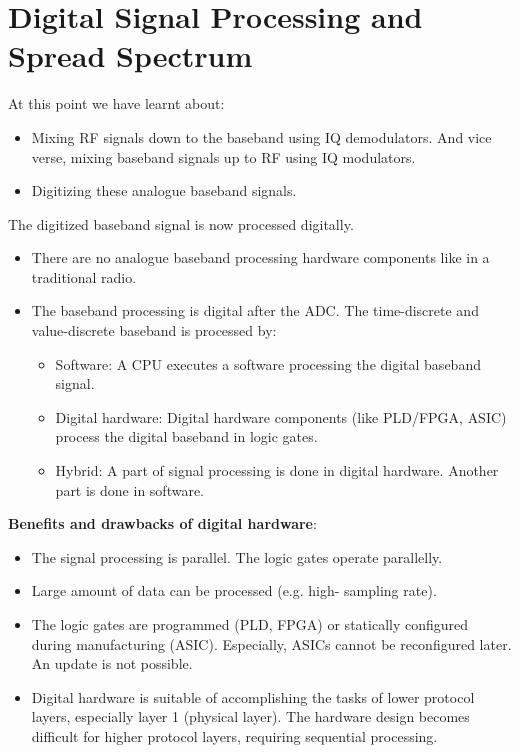 %
%
%

\chapter{Digital Signal Processing and Spread Spectrum}

\begin{refsection}
	
At this point we have learnt about:
\begin{itemize}
	\item Mixing \ac{RF} signals down to the baseband using IQ demodulators. And vice verse, mixing baseband signals up to \ac{RF} using IQ modulators.
	\item Digitizing these analogue baseband signals.
\end{itemize}

The digitized baseband signal is now processed digitally.
\begin{itemize}
	\item There are no analogue baseband processing hardware components like in a traditional radio.
	\item The baseband processing is digital after the \ac{ADC}. The time-discrete and value-discrete baseband is processed by:
	\begin{itemize}
		\item Software: A \ac{CPU} executes a software processing the digital baseband signal.
		\item Digital hardware: Digital hardware components (like \ac{PLD}/\ac{FPGA}, \ac{ASIC}) process the digital baseband in logic gates.
		\item Hybrid: A part of signal processing is done in digital hardware. Another part is done in software.
	\end{itemize}
\end{itemize}

\textbf{Benefits and drawbacks of digital hardware}:
\begin{itemize}
	\item The signal processing is parallel. The logic gates operate parallelly.
	\item Large amount of data can be processed (e.g. high- sampling rate).
	\item The logic gates are programmed (\ac{PLD}, \ac{FPGA}) or statically configured during manufacturing (\ac{ASIC}). Especially, \acp{ASIC} cannot be reconfigured later. An update is not possible.
	\item Digital hardware is suitable of accomplishing the tasks of lower protocol layers, especially layer 1 (physical layer). The hardware design becomes difficult for higher protocol layers, requiring sequential processing.
\end{itemize}


\end{refsection}
